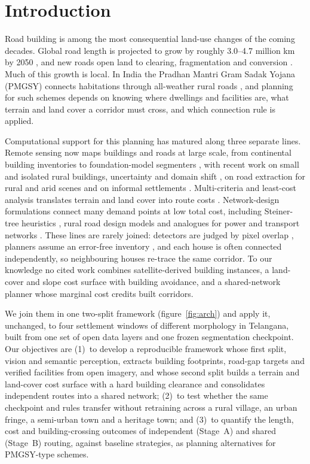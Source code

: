 \documentclass[10pt,a4paper,twocolumn]{article}
\begin{document}
\section{Introduction}
Road building is among the most consequential land-use changes of the coming decades. Global road length is projected to grow by roughly 3.0--4.7 million km by 2050 \cite{meijer2018global}, and new roads open land to clearing, fragmentation and conversion \cite{laurance2014global}. Much of this growth is local. In India the Pradhan Mantri Gram Sadak Yojana (PMGSY) connects habitations through all-weather rural roads \cite{pmgsy}, and planning for such schemes depends on knowing where dwellings and facilities are, what terrain and land cover a corridor must cross, and which connection rule is applied.

Computational support for this planning has matured along three separate lines. Remote sensing now maps buildings and roads at large scale, from continental building inventories \cite{sirko2021openbuildings} to foundation-model segmenters \cite{oquab2023dinov2}, with recent work on small and isolated rural buildings, uncertainty and domain shift \cite{r62,r63,r64,r65,r66,r67,r68,r69,r70}, on road extraction for rural and arid scenes \cite{r56,r57,r58,r59,r60} and on informal settlements \cite{r48}. Multi-criteria and least-cost analysis translates terrain and land cover into route costs \cite{r06,r53,r54,collischonn2000lcp}. Network-design formulations connect many demand points at low total cost, including Steiner-tree heuristics \cite{kou1981steiner,mehlhorn1988steiner,hwang1992steiner,r51}, rural road design models \cite{r41,r43,r44} and analogues for power and transport networks \cite{r45,r46,r47,r50}. These lines are rarely joined: detectors are judged by pixel overlap \cite{r01,foody2002status}, planners assume an error-free inventory \cite{heuvelink1998error}, and each house is often connected independently, so neighbouring houses re-trace the same corridor. To our knowledge no cited work combines satellite-derived building instances, a land-cover and slope cost surface with building avoidance, and a shared-network planner whose marginal cost credits built corridors.

We join them in one two-split framework (figure~\ref{fig:arch}) and apply it, unchanged, to four settlement windows of different morphology in Telangana, built from one set of open data layers and one frozen segmentation checkpoint. Our objectives are (1)~to develop a reproducible framework whose first split, vision and semantic perception, extracts building footprints, road-gap targets and verified facilities from open imagery, and whose second split builds a terrain and land-cover cost surface with a hard building clearance and consolidates independent routes into a shared network; (2)~to test whether the same checkpoint and rules transfer without retraining across a rural village, an urban fringe, a semi-urban town and a heritage town; and (3)~to quantify the length, cost and building-crossing outcomes of independent (Stage~A) and shared (Stage~B) routing, against baseline strategies, as planning alternatives for PMGSY-type schemes.
\end{document}
